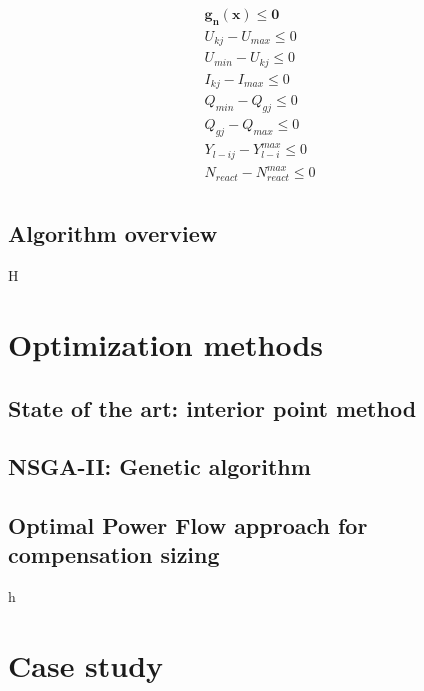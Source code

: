 \documentclass[a4paper,11pt, titlepage, twoside]{article}
\begin{document}
\begin{gather}
    \mathbf{g_n(x)\leq0} \\
    U_{kj}-U_{max}\leq0 \\
    U_{min}-U_{kj}\leq0 \\
    I_{kj}-I_{max}\leq0 \\
    Q_{min}-Q_{gj}\leq0 \\
    Q_{gj}-Q_{max}\leq0 \\
    Y_{l-ij}-Y_{l-i}^{max}\leq0 \\
    N_{react}-N_{react}^{max}\leq0 \\
\end{gather}

\newpage
\subsection{Algorithm overview}
H




\section{Optimization methods}\label{Optimization}

\subsection{State of the art: interior point method}
\subsection{NSGA-II: Genetic algorithm}
\subsection{Optimal Power Flow approach for compensation sizing}
h
\section{Case study}\label{CaseStudies}
\end{document}
